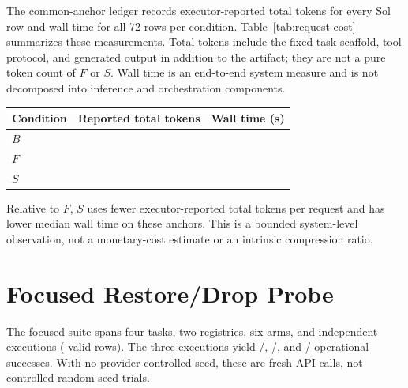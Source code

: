 The common-anchor ledger records executor-reported total tokens for every Sol row and wall time for all 72 rows per condition. Table~\ref{tab:request-cost} summarizes these measurements. Total tokens include the fixed task scaffold, tool protocol, and generated output in addition to the artifact; they are not a pure token count of $F$ or $S$. Wall time is an end-to-end system measure and is not decomposed into inference and orchestration components.

\begin{center}
\label{tab:request-cost}
\footnotesize
\setlength{\tabcolsep}{5pt}
\begin{tabular}{lrr}
\toprule
Condition & Reported total tokens & Wall time (s) \\
\midrule
$B$ & \SolBRequestTokens{} & \SolBMedianSeconds{} \\
$F$ & \SolFRequestTokens{} & \SolFMedianSeconds{} \\
$S$ & \SolSRequestTokens{} & \SolSMedianSeconds{} \\
\bottomrule
\end{tabular}
\end{center}

Relative to $F$, $S$ uses \SolSTokenReduction{} fewer executor-reported total tokens per request and has \SolSLatencyReduction{} lower median wall time on these anchors. This is a bounded system-level observation, not a monetary-cost estimate or an intrinsic compression ratio.

\section{Focused Restore/Drop Probe}
\label{app:focused}

The focused suite spans four tasks, two registries, six arms, and \FocusedRepeats{} independent executions (\FocusedRows{} valid rows). The three executions yield \FocusedSolOneSuccess{}/\FocusedRowsPerRepeat{}, \FocusedSolTwoSuccess{}/\FocusedRowsPerRepeat{}, and \FocusedSolThreeSuccess{}/\FocusedRowsPerRepeat{} operational successes. With no provider-controlled seed, these are fresh API calls, not controlled random-seed trials.


